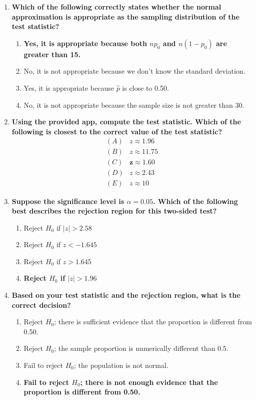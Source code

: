 \documentclass[12pt]{article}
\begin{document}
\begin{enumerate}
\item \textbf{Which of the following correctly states whether the normal approximation is appropriate as the sampling distribution of the test statistic?}
    \begin{enumerate}
        \item \textbf{Yes, it is appropriate because both $np_{0}$ and $n(1-p_{0})$ are greater than 15.}
        \item No, it is not appropriate because we don't know the standard deviation.
        \item Yes, it is appropriate because $\hat{p}$ is close to 0.50.
        \item No, it is not appropriate because the sample size is not greater than 30.
    \end{enumerate}

\item \textbf{Using the provided app, compute the test statistic. Which of the following is closest to the correct value of the test statistic?}
\[
\begin{array}{ll}
(A)& z \approx 1.96\\
(B)& z \approx 11.75\\
(C)& \mathbf{z \approx 1.60}\\
(D)& z \approx 2.43\\
(E)& z \approx 10
\end{array}
\]

\item \textbf{Suppose the significance level is $\alpha = 0.05$. Which of the following best describes the rejection region for this two-sided test?}
    \begin{enumerate}
        \item Reject $H_{0}$ if $|z| > 2.58$
        \item Reject $H_{0}$ if $z < -1.645$
        \item Reject $H_{0}$ if $z > 1.645$
        \item \textbf{Reject $H_{0}$ if $|z| > 1.96$}
    \end{enumerate}

\item \textbf{Based on your test statistic and the rejection region, what is the correct decision?}
    \begin{enumerate}
        \item Reject $H_{0}$; there is sufficient evidence that the proportion is different from 0.50.
        \item Reject $H_{0}$; the sample proportion is numerically different than 0.5.
        \item Fail to reject $H_{0}$; the population is not normal.
        \item \textbf{Fail to reject $H_{0}$; there is not enough evidence that the proportion is different from 0.50.}
    \end{enumerate}


\end{enumerate}
\end{document}
